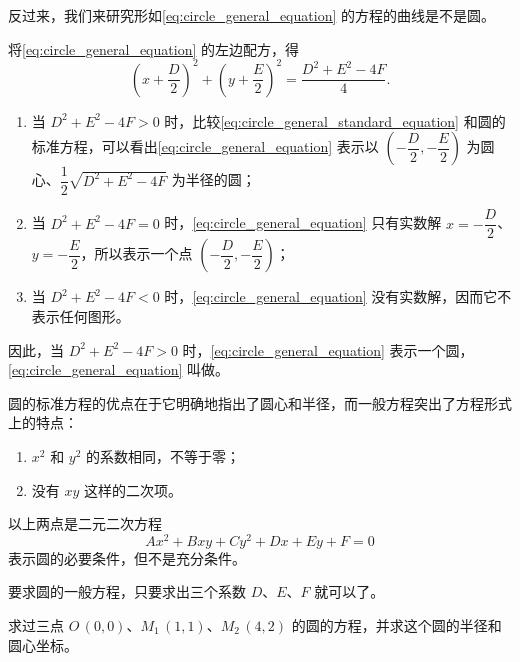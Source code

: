 反过来，我们来研究形如\cref{eq:circle_general_equation} 的方程的曲线是不是圆。

将\cref{eq:circle_general_equation} 的左边配方，得
\begin{equation}
  \label{eq:circle_general_standard_equation}
  \left(x+\frac{D}{2}\right)^2+\left(y+\frac{E}{2}\right)^2=\frac{D^2+E^2-4F}{4}.
\end{equation}
\begin{enumerate}[1.,itemsep=5pt]
  \item 当 $D^2+E^2-4F>0$ 时，比较\cref{eq:circle_general_standard_equation} 和圆的标准方程，可以看出\cref{eq:circle_general_equation} 表示以 $\left(-\dfrac{D}{2},-\dfrac{E}{2}\right)$ 为圆心、$\dfrac{1}{2}\sqrt{D^2+E^2-4F}$ 为半径的圆；
  \item 当 $D^2+E^2-4F=0$ 时，\cref{eq:circle_general_equation} 只有实数解 $x=-\dfrac{D}{2}$、$y=-\dfrac{E}{2}$，所以表示一个点 $\left(-\dfrac{D}{2},-\dfrac{E}{2}\right)$；
  \item 当 $D^2+E^2-4F<0$ 时，\cref{eq:circle_general_equation} 没有实数解，因而它不表示任何图形。
\end{enumerate}

因此，当 $D^2+E^2-4F>0$ 时，\cref{eq:circle_general_equation} 表示一个圆，\cref{eq:circle_general_equation} 叫做。

圆的标准方程的优点在于它明确地指出了圆心和半径，而一般方程突出了方程形式上的特点：
\begin{enumerate}
  \item $x^2$ 和 $y^2$ 的系数相同，不等于零；
  \item 没有 $xy$ 这样的二次项。
\end{enumerate}

以上两点是二元二次方程
\[ Ax^2+Bxy+Cy^2+Dx+Ey+F=0\]
表示圆的必要条件，但不是充分条件。

要求圆的一般方程，只要求出三个系数 $D$、$E$、$F$ 就可以了。
\begin{example}
  求过三点 $O\,(0,0)$、$M_1\,(1,1)$、$M_2\,(4,2)$ 的圆的方程，并求这个圆的半径和圆心坐标。
\end{example}


